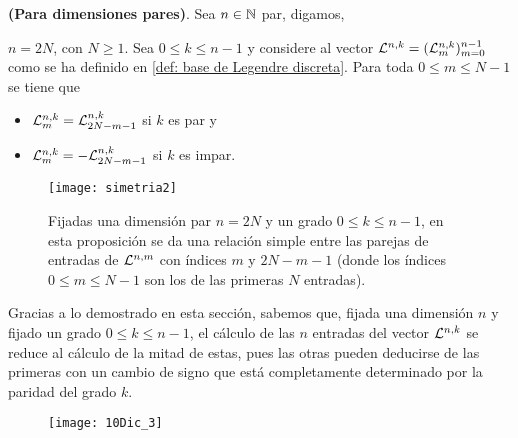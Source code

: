 \begin{teo}
\label{prop: simetrias en dimensiones pares}
\textbf{(Para dimensiones pares)}. Sea $n \in \mathbb{N}$ par, digamos,

$n=2N$, con $N \geq 1$. Sea $0 \leq k \leq n-1$ y
considere al vector $\mathcal{L}^{n,k}=(\mathcal{L}^{n,k}_{m})_{m=0}^{n-1}$
como se ha definido en \eqref{def: base de Legendre discreta}.
Para toda $0 \leq m \leq N-1$ se tiene que
\begin{itemize}
\item $\mathcal{L}^{n,k}_{m} = \mathcal{L}^{n,k}_{2N-m-1}$ si $k$ es par y
\item $\mathcal{L}^{n,k}_{m} = -\mathcal{L}^{n,k}_{2N-m-1}$ si $k$ es impar.
\end{itemize}
\end{teo}
\begin{figure}[H]
\centering\captionsetup{format = hang}
	\begin{measuredfigure}
		\texttt{[image: simetria2]} 
		\caption{Fijadas una dimensión par $n=2N$ 
		y un grado $0 \leq k \leq n-1$,
		en esta proposición se da una relación simple entre las parejas 
		de entradas de $\mathcal{L}^{n,m}$ con índices $m$ y $2N-m-1$ 
		(donde los índices $0 \leq m \leq N-1$ son los de las primeras
		$N$ entradas).}
 	\end{measuredfigure}
 \end{figure}

Gracias a lo demostrado en esta sección, sabemos que,
fijada una dimensión $n$ y fijado un grado $0 \leq k \leq n-1$,
el cálculo de las $n$ entradas del vector $\mathcal{L}^{n,k}$
se reduce al cálculo de la mitad de estas, pues las otras pueden
deducirse de las primeras con un cambio de signo que está completamente
determinado por la paridad del grado $k$.


\begin{figure}[H]
\centering\captionsetup{format = hang}
	\begin{measuredfigure}
		\texttt{[image: 10Dic\_3]} 
		\caption{}
 	\end{measuredfigure}
 \end{figure}
